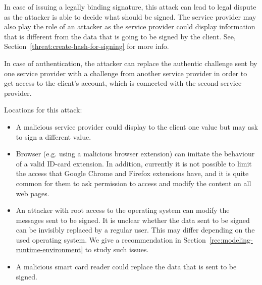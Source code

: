 In case of issuing a legally binding signature, this attack can lead to legal dispute as the attacker is able to decide what should be signed. The service provider may also play the role of an attacker as the service provider could display information that is different from the data that is going to be signed by the client. See, Section~\ref{threat:create-hash-for-signing} for more info.

In case of authentication, the attacker can replace the authentic challenge sent by one service provider with a challenge from another service provider in order to get access to the client's account, which is connected with the second service provider.

Locations for this attack:
\begin{itemize}
	\item A malicious service provider could  display to the client one value but may ask to sign a different value.
	\item Browser (e.g. using a malicious browser extension) can imitate the behaviour of a valid ID-card extension. In addition, currently it is not possible to limit the access that Google Chrome and Firefox extensions have, and it is quite common for them to ask permission to access and modify the content on all web pages. 
	
	\item An attacker with root access to the operating system can modify the messages sent to be signed. It is unclear whether the data sent to be signed can be invisibly replaced by a regular user. This may differ depending on the used operating system. We give a recommendation in Section~\ref{rec:modeling-runtime-environment} to study such issues.
	
	\item A malicious smart card reader could replace the data that is sent to be signed.
\end{itemize}

